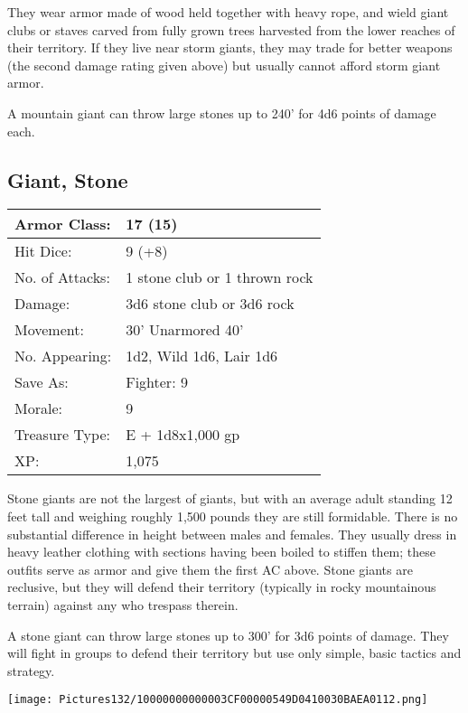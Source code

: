 \documentclass[a4paper,twoside,openany,10pt]{book}
\begin{document}
\begin{multicols}{2}
They wear armor made of wood held together with heavy rope, and wield giant clubs or staves carved from fully grown trees harvested from the lower reaches of their territory. If they live near storm giants, they may trade for better weapons (the second damage rating given above) but usually cannot afford storm giant armor.

A mountain giant can throw large stones up to 240' for 4d6 points of damage each.

\columnbreak

\subsection*{Giant, Stone}\label{giant-stone}

\begin{tabularx}{0.48\textwidth}{@{}lX@{}}
Armor Class: & 17 (15) \\\hline
Hit Dice: & 9 (+8) \\\hline
No. of Attacks: & 1 stone club or 1 thrown rock \\\hline
Damage: & 3d6 stone club or 3d6 rock \\\hline
Movement: & 30' Unarmored 40' \\\hline
No. Appearing: & 1d2, Wild 1d6, Lair 1d6 \\\hline
Save As: & Fighter: 9 \\\hline
Morale: & 9 \\\hline
Treasure Type: & E + 1d8x1,000 gp \\\hline
XP: & 1,075 \\\hline
\end{tabularx}\medskip

Stone giants are not the largest of giants, but with an average adult standing 12 feet tall and weighing roughly 1,500 pounds they are still formidable. There is no substantial difference in height between males and females. They usually dress in heavy leather clothing with sections having been boiled to stiffen them; these outfits serve as armor and give them the first AC above. Stone giants are reclusive, but they will defend their territory (typically in rocky mountainous terrain) against any who trespass therein.

A stone giant can throw large stones up to 300' for 3d6 points of damage. They will fight in groups to defend their territory but use only simple, basic tactics and strategy. 

\begin{center}
	\texttt{[image: Pictures132/10000000000003CF00000549D0410030BAEA0112.png]}
\end{center}


\end{multicols}
\end{document}
